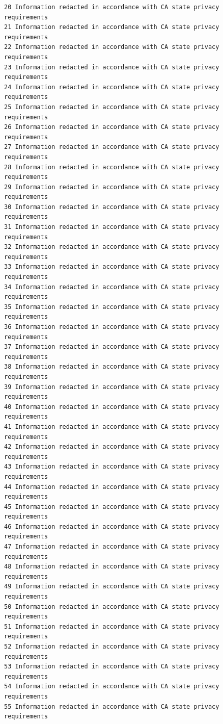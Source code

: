 \documentclass[
  letterpaper,
  DIV=11,
  numbers=noendperiod]{scrartcl}
\begin{document}
\begin{verbatim}
20 Information redacted in accordance with CA state privacy requirements
21 Information redacted in accordance with CA state privacy requirements
22 Information redacted in accordance with CA state privacy requirements
23 Information redacted in accordance with CA state privacy requirements
24 Information redacted in accordance with CA state privacy requirements
25 Information redacted in accordance with CA state privacy requirements
26 Information redacted in accordance with CA state privacy requirements
27 Information redacted in accordance with CA state privacy requirements
28 Information redacted in accordance with CA state privacy requirements
29 Information redacted in accordance with CA state privacy requirements
30 Information redacted in accordance with CA state privacy requirements
31 Information redacted in accordance with CA state privacy requirements
32 Information redacted in accordance with CA state privacy requirements
33 Information redacted in accordance with CA state privacy requirements
34 Information redacted in accordance with CA state privacy requirements
35 Information redacted in accordance with CA state privacy requirements
36 Information redacted in accordance with CA state privacy requirements
37 Information redacted in accordance with CA state privacy requirements
38 Information redacted in accordance with CA state privacy requirements
39 Information redacted in accordance with CA state privacy requirements
40 Information redacted in accordance with CA state privacy requirements
41 Information redacted in accordance with CA state privacy requirements
42 Information redacted in accordance with CA state privacy requirements
43 Information redacted in accordance with CA state privacy requirements
44 Information redacted in accordance with CA state privacy requirements
45 Information redacted in accordance with CA state privacy requirements
46 Information redacted in accordance with CA state privacy requirements
47 Information redacted in accordance with CA state privacy requirements
48 Information redacted in accordance with CA state privacy requirements
49 Information redacted in accordance with CA state privacy requirements
50 Information redacted in accordance with CA state privacy requirements
51 Information redacted in accordance with CA state privacy requirements
52 Information redacted in accordance with CA state privacy requirements
53 Information redacted in accordance with CA state privacy requirements
54 Information redacted in accordance with CA state privacy requirements
55 Information redacted in accordance with CA state privacy requirements

\end{verbatim}
\end{document}
